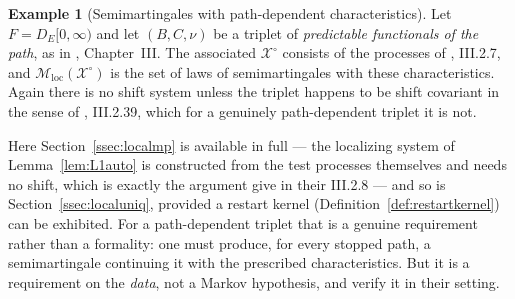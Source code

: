 \documentclass[11pt,a4paper]{article}
\theoremstyle{plain}
\theoremstyle{definition}
\newtheorem{example}[theorem]{Example}
\theoremstyle{remark}
\newcommand{\DE}{D_E[0,\infty)}
\newcommand{\XX}{\mathcal{X}}                  %
\newcommand{\Msol}{\mathcal{M}}
\newcommand{\JS}{\cite{JS03}}
\begin{document}
\begin{example}[Semimartingales with path-dependent characteristics]
  \label{ex:pathdepsemi}
  Let $F = \DE$ and let $(B,C,\nu)$ be a triplet of \emph{predictable functionals
  of the path}, as in \JS, Chapter~III.  The associated $\XX^\circ$ consists of
  the processes of \JS, III.2.7, and $\Msol_{\mathrm{loc}}(\XX^\circ)$ is the set
  of laws of semimartingales with these characteristics.  Again there is no shift
  system unless the triplet happens to be shift covariant in the sense of
  \JS, III.2.39, which for a genuinely path-dependent triplet it is not.

  Here Section~\ref{ssec:localmp} is available in full --- the localizing system
  of Lemma~\ref{lem:L1auto} is constructed from the test processes themselves and
  needs no shift, which is exactly the argument \JS{} give in their III.2.8 ---
  and so is Section~\ref{ssec:localuniq}, provided a restart kernel
  (Definition~\ref{def:restartkernel}) can be exhibited.  For a path-dependent
  triplet that is a genuine requirement rather than a formality: one must produce,
  for every stopped path, a semimartingale continuing it with the prescribed
  characteristics.  But it is a requirement on the \emph{data}, not a Markov
  hypothesis, and \JS{} verify it in their setting.
\end{example}
\end{document}
